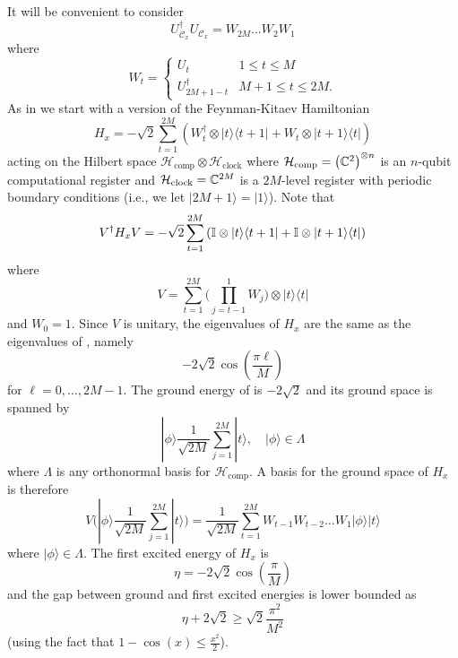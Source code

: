\documentclass[../thesis-main/thesis-main]{subfiles}
\begin{document}
It will be convenient to consider 
\[
  U_{\mathcal{C}_{x}}^{\dagger}U_{\mathcal{C}_{x}}=W_{2M}\ldots W_{2}W_{1}
\]
where
\[
W_{t}=\begin{cases}
U_{t} & 1\leq t\leq M\\
U_{2M+1-t}^{\dagger} & M+1 \le t \le 2M.
\end{cases}
\]
As in  we start with a version of the Feynman-Kitaev Hamiltonian \cite{Fey85,KSV02}
\begin{equation}
H_{x}=-\sqrt{2}\sum_{t=1}^{2M}\left(W_{t}^{\dagger}\otimes|t\rangle\langle t+1|+W_{t}\otimes|t+1\rangle\langle t|\right)\label{eq:H_x}
\end{equation}
acting on the Hilbert space $\mathcal{H}_{\text{comp}} \otimes \mathcal{H}_{\text{clock}}$ where $\mathcal{H}_{\text{comp}} = \left(\mathbb{C}^{2}\right)^{\otimes n}$ is an $n$-qubit computational register and $\mathcal{H}_{\text{clock}}=\mathbb{C}^{2M}$ is a $2M$-level register with periodic boundary conditions (i.e., we let $|2M+1\rangle=|1\rangle$). Note that 
\begin{equation}
V^{\dagger}H_{x}V=-\sqrt{2}\sum_{t=1}^{2M}\left(\mathbb{I}\otimes|t\rangle\langle t+1|+\mathbb{I}\otimes|t+1\rangle\langle t|\right)\label{eq:V_H_V}
\end{equation}
where 
\[
V=\sum_{t=1}^{2M}\bigg(\prod_{j=t-1}^{1}W_{j}\bigg)\otimes|t\rangle\langle t|
\]
and $W_{0}=1$. Since $V$ is unitary, the eigenvalues of $H_{x}$ are the same as the eigenvalues of , namely 
\[
-2\sqrt{2}\cos\left(\frac{\pi \ell}{M}\right)
\]
for $\ell=0,\ldots,2M-1$. The ground energy of  is $-2\sqrt{2}$ and its ground space is spanned by 
\[
  |\phi\rangle\frac{1}{\sqrt{2M}}\sum_{j=1}^{2M}|t\rangle,
  \quad|\phi\rangle\in\Lambda
\]
where $\Lambda$ is any orthonormal basis for $\mathcal{H}_{\mathrm{comp}}$. A basis for the ground space of $H_{x}$ is therefore 
\[
V\bigg(|\phi\rangle\frac{1}{\sqrt{2M}}\sum_{j=1}^{2M}|t\rangle\bigg)=\frac{1}{\sqrt{2M}}\sum_{t=1}^{2M}W_{t-1}W_{t-2}\ldots W_{1}|\phi\rangle|t\rangle
\]
 where $|\phi\rangle\in\Lambda$. The first excited energy of $H_{x}$ is 
\[
\eta=-2\sqrt{2}\cos\left(\frac{\pi}{M}\right)
\]
and the gap between ground and first excited energies is lower bounded as 
\begin{equation}
\eta+2\sqrt{2}\geq\sqrt{2}\frac{\pi^{2}}{M^{2}}\label{eq:bound_on_eta}
\end{equation}
(using the fact that $1-\cos(x)\leq\frac{x^{2}}{2}$).
\end{document}
